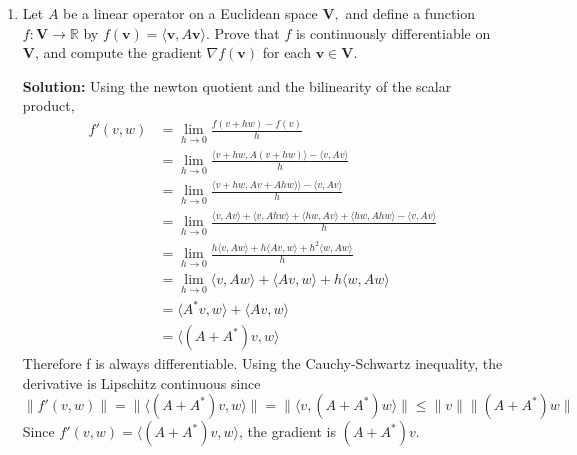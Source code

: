 \documentclass{report}
\newcommand{\solution}{\textbf{Solution: }}
\newcommand{\inner}[2]{\langle #1, #2 \rangle}
\newcommand{\pDiv}[1]{\frac{\partial}{\partial #1}}
\begin{document}
\begin{enumerate}
\begin{enumerate}
			\smallskip
			\item
			Compute the partial derivatives of $f$ at a given point 
			$\mathbf{v}\in \mathbb{R}^n.$
			
			\smallskip
			\item
			Prove that $f$ is continuously differentiable on $\mathbb{R}^n.$
			
			\smallskip
			\item
			Compute the gradient of $f$ at a given $\mathbf{v} \in \mathbb{R}^n$.
		\end{enumerate}

	\solution 
	\begin{enumerate}
		\item 
		Decomposing v into its $n$ components,
		\[
			\pDiv{x_i} f(v) = 
			\pDiv{x_i} (v \cdot v) = 
			\pDiv{x_i} \sum_{j=1}^n x_j^2 = 
			2x_i
		\]

		\item 
		$f$ is differentiable since partial derivative exist for all basis vectors,
		and the partial derivatives, $2x_i$, are all continuous.

		\item 
		The gradient is a vector composed of all the partial derivatives so,
		\[
			\nabla f(v) = (2x_1, ..., 2x_n) = 2v
		\]
	\end{enumerate}
		
	\medskip
	\item
	Let $A$ be a linear operator on a Euclidean space $\mathbf{V},$ 
	and define a function $f \colon \mathbf{V} \to \mathbb{R}$ by 
	$f(\mathbf{v})=\langle \mathbf{v},A\mathbf{v}\rangle$. Prove
	that $f$ is continuously differentiable on $\mathbf{V}$, and compute 
	the gradient $\nabla f(\mathbf{v})$ for each $\mathbf{v} \in \mathbf{V}.$

	\solution 
	Using the newton quotient and the bilinearity of the scalar product,
	\begin{align*}
		f'(v, w)
		&= \lim_{h\to0} \frac{f(v+hw) - f(v)}{h} \\
		&= \lim_{h\to0} \frac{\inner{v+hw}{A(v+hw)} - \inner{v}{Av}}{h} \\
		&= \lim_{h\to0} \frac{\inner{v+hw}{Av+Ahw)} - \inner{v}{Av}}{h} \\
		&= \lim_{h\to0} 
			\frac{\inner{v}{Av} + \inner{v}{Ahw} + \inner{hw}{Av} + \inner{hw}{Ahw} 
			- \inner{v}{Av}}{h} \\
		&= \lim_{h\to0} \frac{h\inner{v}{Aw} + h\inner{Av}{w} + h^2\inner{w}{Aw}}{h} \\
		&= \lim_{h\to0} \inner{v}{Aw} + \inner{Av}{w} + h\inner{w}{Aw} \\
		&= \inner{A^*v}{w} + \inner{Av}{w} \\
		&= \inner{(A+A^*)v}{w} 
	\end{align*}
	Therefore f is always differentiable.
	Using the Cauchy-Schwartz inequality, 
	the derivative is Lipschitz continuous since
	\[
		\|f'(v, w)\| =
		\|\inner{(A+A^*)v}{w}\| =
		\|\inner{v}{(A+A^*)w}\| \leq
		\|v\| \|(A+A^*)w\|
	\]
	Since $f'(v, w) = \inner{(A+A^*)v}{w}$, the gradient is $(A+A^*)v$.
			
\end{enumerate}
	
\end{document}
